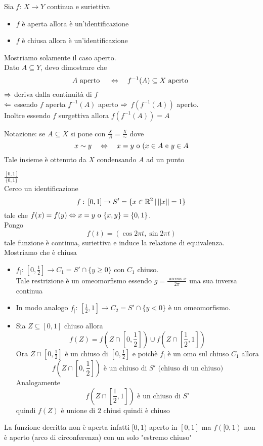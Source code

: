 \spazio
\begin{prop}Sia $f:\, X \to Y$ continua e suriettiva
\begin{itemize}
\item $f$ \`e aperta allora \`e un'identificazione
\item $f$ \`e chiusa allora \`e un'identificazione 
\end{itemize}
\proof Mostriamo solamente il caso aperto.\\
Dato $A\subseteq Y$, devo dimostrare che
$$A \text{ aperto } \quad \Leftrightarrow \quad f^{-1}(A) \subseteq X \text{ aperto } $$
$\Rightarrow$ deriva dalla continuit\`a di $f$\\
$\Leftarrow$ essendo $f$ aperta $f^{-1}(A)$ aperto $\Rightarrow$ $ f(f^{-1}(A))$ aperto.\\
Inoltre essendo $f$ surgettiva allora $f(f^{-1}(A))=A$
\endproof
\end{prop}
\spazio
Notazione: se $A \subseteq X $ si pone con $\frac{X}{A}=\frac{X}{\sim} $ dove 
$$ x\sim y \quad\Leftrightarrow \quad x=y  \text{ o }  (x\in A \text{ e } y \in A $$
Tale insieme \`e ottenuto da $X$ condensando $A$ ad un punto 
\begin{ese} $\frac{[0,1]}{\{ 0, 1\}}$\\
Cerco un identificazione 
$$ f:\, [0,1]\to S' =\{ x \in \mathbb{R}^2 \, \vert \, \vert \vert x \vert \vert =1 \}$$
tale che $f(x)=f(y) \Leftrightarrow x=y \text{ o } \{ x ,y \}=\{ 0,1\}$.\\
Pongo 
$$ f(t)= (\cos 2\pi t, \sin 2\pi t )$$ 
tale funzione \`e continua, suriettiva e induce la relazione di equivalenza.\\
Mostriamo che \`e chiusa 
\begin{itemize}
\item $f_\vert: \, \left[ 0, \frac{1}{2} \right] \to  C_1 =S' \cap \{ y \geq 0 \}$ con $C_1$ chiuso.\\
Tale restrizione \`e un omeomorfismo essendo $g=\frac{\arccos x}{2\pi}$ una sua inversa continua
\item In modo analogo $f_\vert:\, \left[ \frac{1}{2}, 1 \right] \to C_2=S'\cap \{ y<0\}$ \`e un omeomorfismo.\\
\item Sia $Z\subseteq [0,1]$ chiuso allora 
$$ f(Z) = f\left( Z \cap \left[ 0, \frac{1}{2}\right] \right) \cup f\left( Z \cap \left[ \frac{1}{2},1\right] \right)$$
Ora $Z \cap \left[ 0, \frac{1}{2}\right]$ \`e un chiuso di $\left[0, \frac{1}{2}\right]$ e poich\`e $f_\vert$ \`e un omo sul chiuso $C_1$ allora $$f\left(  Z \cap \left[ 0, \frac{1}{2}\right] \right) \text{ \`e un chiuso di } S' \text{ (chiuso di un chiuso)}$$
Analogamente
$$ f\left(  Z \cap \left[ \frac{1}{2},1\right] \right) \text{ \`e un chiuso di } S'$$
quindi $f(Z)$ \`e unione di $2$ chiusi quindi \`e chiuso
\end{itemize}
\begin{oss}La funzione decritta non \`e aperta infatti $[0,1)$ aperto 
in $[0,1]$ ma $f([0,1)$ non \`e aperto (arco di circonferenza) con un solo "estremo chiuso"
\end{oss}
\end{ese}
